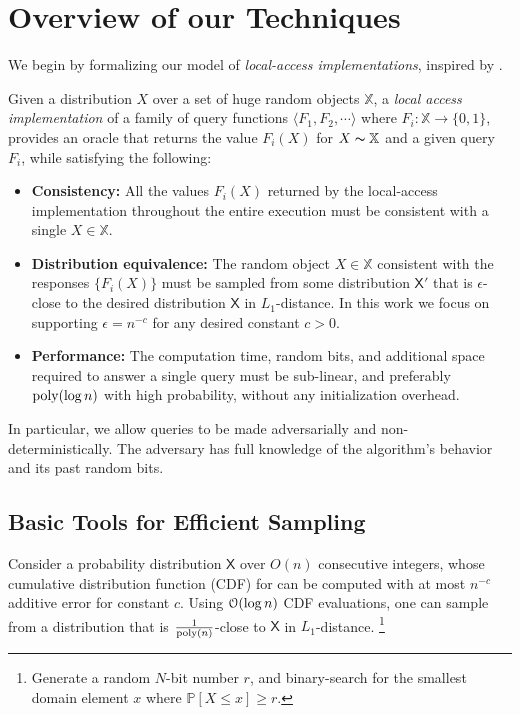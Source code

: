 \section{Overview of our Techniques}
\label{sec:overview_of_our_techniques}
We begin by formalizing our model of \emph{local-access implementations}, inspired by \cite{reut}.

\begin{definition}
\label{def:local_access}
Given a distribution $X$ over a set of huge random objects $\mathbb X$, a \emph{local access implementation}
of a family of query functions $\langle F_1, F_2,\cdots \rangle$ where $F_i: \mathbb X\rightarrow \{0,1\}$,
provides an oracle that returns the value $F_i(X)$ for $X\thicksim \mathbb X$ and a given query $F_i$, while satisfying the following:
\begin{itemize}
    \item \textbf{Consistency:}
    All the values $F_i(X)$ returned by the local-access implementation throughout the entire execution
    must be consistent with a single $X\in \mathbb X$.
    \item \textbf{Distribution equivalence:}
    The random object $X\in \mathbb X$ consistent with the responses $\{ F_i(X)\}$ must be sampled from some distribution $\mathsf{X}'$
    that is $\epsilon$-close to the desired distribution $\mathsf{X}$ in $L_1$-distance.
    In this work we focus on supporting $\epsilon = n^{-c}$ for any desired constant $c>0$.
    \item \textbf{Performance:}
    The computation time, random bits, and additional space required to answer a single query must be sub-linear,
    and preferably $\mathrm{poly}(\log n)$ with high probability, without any initialization overhead.
\end{itemize}
\end{definition}
In particular, we allow queries to be made adversarially and non-deterministically.
The adversary has full knowledge of the algorithm's behavior and its past random bits.




\subsection{Basic Tools for Efficient Sampling}
\label{sec:basic_tools_for_efficient_sampling}
Consider a probability distribution $\mathsf{X}$ over $O(n)$ consecutive integers,
whose cumulative distribution function (CDF) for can be computed with at most $n^{-c}$ additive error for constant $c$.
Using $\Bo(\log n)$ CDF evaluations, one can sample from a distribution that is $\frac{1}{\mathrm{poly}(n)}$-close to $\mathsf{X}$ in $L_1$-distance.
\footnote{Generate a random $N$-bit number $r$, and binary-search for the smallest domain element $x$ where $\mathbb P[X\leq x] \geq r$.}


